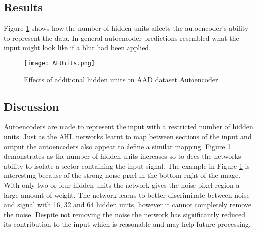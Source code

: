 \subsection{Results}
Figure \ref{fig:AEUnits} shows how the number of hidden units affects the autoencoder's ability to represent the data. 
In general autoencoder predictions resembled what the input might look like if a blur had been applied. 

\begin{figure}[h]
    \centering
    \texttt{[image: AEUnits.png]}
    \caption{Effects of additional hidden units on AAD dataset Autoencoder}
    \label{fig:AEUnits}
\end{figure}


\subsection{Discussion}
Autoencoders are made to represent the input with a restricted number of hidden units.
Just as the AHL networks learnt to map between sections of the input and output the autoencoders also appear to define a similar mapping. 
Figure \ref{fig:AEUnits} demonstrates as the number of hidden units increases so to does the networks ability to isolate a sector containing the input signal.
The example in Figure \ref{fig:AEUnits} is interesting because of the strong noise pixel in the bottom right of the image. 
With only two or four hidden units the network gives the noise pixel region a large amount of weight.
The network learns to better discriminate between noise and signal with 16, 32 and 64 hidden units, however it cannot completely remove the noise.
Despite not removing the noise the network has significantly reduced its contribution to the input which is reasonable and may help future processing. 
